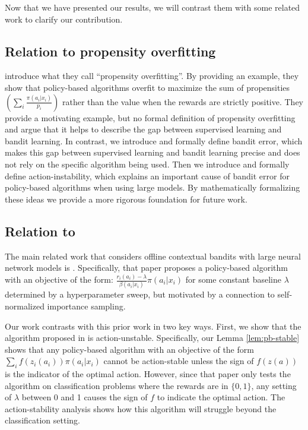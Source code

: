 Now that we have presented our results, we will contrast them with some related work to clarify our contribution.

\subsection{Relation to propensity overfitting}
\citet{swaminathan2015self} introduce what they call ``propensity overfitting''. By providing an example, they show that policy-based algorithms overfit to maximize the sum of propensities $( \sum_i \frac{\pi(a_i|x_i)}{p_i})$ rather than the value when the rewards are strictly positive. They provide a motivating example, but no formal definition of propensity overfitting and argue that it helps to describe the gap between supervised learning and bandit learning. In contrast, we introduce and formally define bandit error, which makes this gap between supervised learning and bandit learning precise and does not rely on the specific algorithm being used. Then we introduce and formally define action-instability, which explains an important cause of bandit error for policy-based algorithms when using large models.
By mathematically formalizing these ideas we provide a more rigorous foundation for future work.

\subsection{Relation to \cite{joachims2018deep}}

The main related work that considers offline contextual bandits with large neural network models is \citet{joachims2018deep}. Specifically, that paper proposes a policy-based algorithm with an objective of the form: $\frac{r_i(a_i) - \lambda}{\beta(a_i|x_i)} \pi(a_i|x_i)$ for some constant baseline $ \lambda$ determined by a hyperparameter sweep, but motivated by a connection to self-normalized importance sampling.

Our work contrasts with this prior work in two key ways. First, we show that the algorithm proposed in \citet{joachims2018deep} is action-unstable. Specifically, our Lemma \ref{lem:pb-stable} shows that any policy-based algorithm with an objective of the form $ \sum_i f(z_i(a_i)) \pi(a_i|x_i)$ cannot be action-stable unless the sign of $ f(z(a))$ is the indicator of the optimal action. However, since that paper only tests the algorithm on classification problems where the rewards are in $ \{0,1\}$, any setting of $ \lambda$ between 0 and 1 causes the sign of $ f $ to indicate the optimal action. The action-stability analysis shows how this algorithm will struggle beyond the classification setting.

